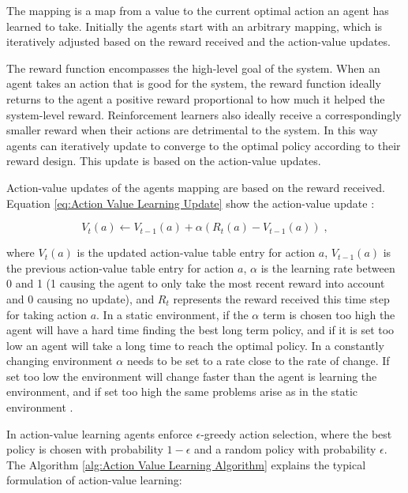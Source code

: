 \documentclass[onehalf,11pt]{beavtex}
\begin{document}
The mapping is a map from a value to the current optimal action an agent has learned to take. Initially the agents start with an arbitrary mapping, which is iteratively adjusted based on the reward received and the action-value updates.

The reward function encompasses the high-level goal of the system. When an agent takes an action that is good for the system, the reward function ideally returns to the agent a positive reward proportional to how much it helped the system-level reward. Reinforcement learners also ideally receive a correspondingly smaller reward when their actions are detrimental to the system. In this way agents can iteratively update to converge to the optimal policy according to their reward design. This update is based on the action-value updates.

Action-value updates of the agents mapping are based on the reward received. Equation \ref{eq:Action Value Learning Update} show the action-value update \cite{Sutton98reinforcementlearning}: 

\begin{equation} \label{eq:Action Value Learning Update}
V_t(a) \leftarrow V_{t-1}(a) + \alpha (R_t(a) - V_{t-1}(a))\;,
\end{equation}

where $V_t(a)$ is the updated action-value table entry for action $a$, $V_{t-1}(a)$ is the previous action-value table entry for action $a$, $\alpha$ is the learning rate between 0 and 1 (1 causing the agent to only take the most recent reward into account and 0 causing no update), and $R_t$ represents the reward received this time step for taking action $a$. In a static environment, if the $\alpha$ term is chosen too high the agent will have a hard time finding the best long term policy, and if it is set too low an agent will take a long time to reach the optimal policy. In a constantly changing environment $\alpha$ needs to be set to a rate close to the rate of change. If set too low the environment will change faster than the agent is learning the environment, and if set too high the same problems arise as in the static environment \cite{Sutton98reinforcementlearning}.

In action-value learning agents enforce $\epsilon$-greedy action selection, where the best policy is chosen with probability $1 - \epsilon$ and a random policy with probability $\epsilon$. The Algorithm \ref{alg:Action Value Learning Algorithm} explains the typical formulation of action-value learning:
\end{document}

